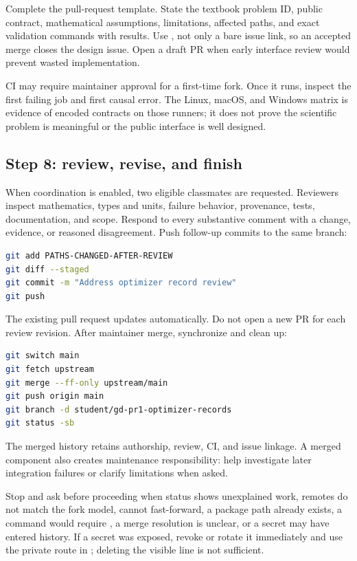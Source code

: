 Complete the pull-request template. State the textbook problem ID, public
contract, mathematical assumptions, limitations, affected paths, and exact
validation commands with results. Use , not only a
bare issue link, so an accepted merge closes the design issue. Open a draft PR
when early interface review would prevent wasted implementation.

CI may require maintainer approval for a first-time fork. Once it runs, inspect
the first failing job and first causal error. The Linux, macOS, and Windows
matrix is evidence of encoded contracts on those runners; it does not prove the
scientific problem is meaningful or the public interface is well designed.

\subsection*{Step 8: review, revise, and finish}

When coordination is enabled, two eligible classmates are requested. Reviewers
inspect mathematics, types and units, failure behavior, provenance, tests,
documentation, and scope. Respond to every substantive comment with a change,
evidence, or reasoned disagreement. Push follow-up commits to the same branch:

\begin{lstlisting}[language=bash,numbers=none]
git add PATHS-CHANGED-AFTER-REVIEW
git diff --staged
git commit -m "Address optimizer record review"
git push
\end{lstlisting}

The existing pull request updates automatically. Do not open a new PR for each
review revision. After maintainer merge, synchronize and clean up:

\begin{lstlisting}[language=bash,numbers=none]
git switch main
git fetch upstream
git merge --ff-only upstream/main
git push origin main
git branch -d student/gd-pr1-optimizer-records
git status -sb
\end{lstlisting}

The merged history retains authorship, review, CI, and issue linkage. A merged
component also creates maintenance responsibility: help investigate later
integration failures or clarify limitations when asked.

\begin{warningbox}
Stop and ask before proceeding when status shows unexplained work, remotes do
not match the fork model,  cannot fast-forward, a package path already
exists, a command would require , a merge resolution is unclear,
or a secret may have entered history. If a secret was exposed, revoke or rotate
it immediately and use the private route in ; deleting the
visible line is not sufficient.
\end{warningbox}

